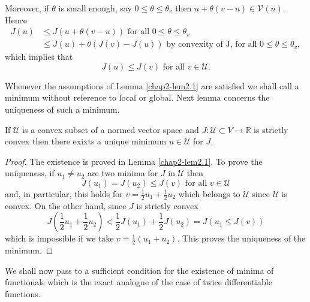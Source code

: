 Moreover, if $\theta$ is small enough, say $0 \leq \theta \leq \theta_{v}$ then $u + \theta(v-u) \in \mathscr{V}(u)$. Hence
\begin{align*}
J(u) & \leq J(u + \theta(v-u)) \text{ for all } 0 \leq \theta \leq \theta_{v}\\
& \leq J(u) + \theta(J(v) - J(u)) \text{ by convexity of J, for all } 0 \leq \theta \leq \theta_{v},
\end{align*}
which implies that
$$
J(u) \leq J(v) \text{ for all } v \in \mathcal{U}.
$$\pageoriginale

Whenever the assumptions of Lemma \ref{chap2-lem2.1} are satisfied we shall call a minimum without reference to local or global. Next lemma concerns the uniqueness of such a minimum.

\begin{lemma}\label{chap2-lem2.2}
If $\mathcal{U}$ is a convex subset of a normed vector space and $J : \mathcal{U} \subset V \to \mathbb{R}$ is strictly convex then there exixts a unique minimum $u \in \mathcal{U}$ for $J$.
\end{lemma}

\begin{proof}
The existence is proved in Lemma \ref{chap2-lem2.1}. To prove the uniqueness, if $u_{1} \neq u_{2}$ are two minima for $J$ in $\mathcal{U}$ then
$$
J(u_{1}) = J(u_{2}) \leq J(v) \text{ for all } v \in \mathcal{U}
$$
and, in particular, this holds for $v = \frac{1}{2} u_{1} + \frac{1}{2} u_{2}$ which belongs to $\mathcal{U}$ since $\mathcal{U}$ is convex. On the other hand, since $J$ is strictly convex
$$
J(\frac{1}{2} u_{1} + \frac{1}{2} u_{2}) < \frac{1}{2} J(u_{1}) + \frac{1}{2} J(u_{2}) = J(u_{1} \leq J(v)) 
$$
which is impossible if we take $v = \frac{1}{2} (u_{1} + u_{2})$. This proves the uniqueness of the minimum.
\end{proof}

We shall now pass to a sufficient condition for the existence of minima of functionals which is the exact analogue of the case of twice differentiable functions.

